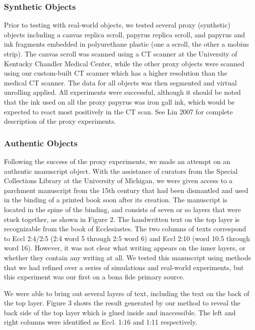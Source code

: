 \documentclass[12pt]{article}
\begin{document}
\subsubsection*{Synthetic Objects}

Prior to testing with real-world objects, we tested several proxy (synthetic) objects including a canvas replica scroll, papyrus replica scroll, and papyrus and ink fragments embedded in polyurethane plastic (one a scroll, the other a mobius strip). The canvas scroll was scanned using a CT scanner at the University of Kentucky Chandler Medical Center, while the other proxy objects were scanned using our custom-built CT scanner which has a higher resolution than the medical CT scanner. The data for all objects was then segmented and virtual unrolling applied. All experiments were successful, although it should be noted that the ink used on all the proxy papyrus was iron gall ink, which would be expected to react most positively in the CT scan. See Lin 2007 for complete description of the proxy experiments.

\subsubsection*{Authentic Objects}

Following the success of the proxy experiments, we made an attempt on an authentic manuscript object. With the assistance of curators from the Special Collections Library at the University of Michigan, we were given access to a parchment manuscript from the 15th century that had been dismantled and used in the binding of a printed book soon after its creation. The manuscript is located in the spine of the binding, and consists of seven or so layers that were stuck together, as shown in Figure 2. The handwritten text on the top layer is recognizable from the book of Ecclesiastes. The two columns of texts correspond to Eccl 2:4/2:5 (2:4 word 5 through 2:5 word 6) and Eccl 2:10 (word 10.5 through word 16). However, it was not clear what writing appears on the inner layers, or whether they contain any writing at all. We tested this manuscript using methods that we had refined over a series of simulations and real-world experiments, but this experiment was our first on a bona fide primary source.
 
We were able to bring out several layers of text, including the text on the back of the top layer. Figure 3 shows the result generated by our method to reveal the back side of the top layer which is glued inside and inaccessible. The left and right columns were identified as Eccl. 1:16 and 1:11 respectively.
 
\end{document}
